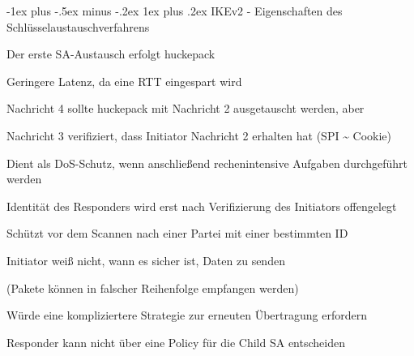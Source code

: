\documentclass[a4paper]{article}
\makeatletter
\renewcommand{\subsubsection}{\@startsection{subsubsection}{3}{0mm}%
 {-1ex plus -.5ex minus -.2ex}%
 {1ex plus .2ex}%
 {\normalfont\small\bfseries}}
\makeatother
\begin{document}
\begin{multicols}{3}
      \subsubsection{IKEv2 - Eigenschaften des Schlüsselaustauschverfahrens}
      \begin{itemize*}
            \item Der erste SA-Austausch erfolgt huckepack
            \begin{itemize*}
                  \item Geringere Latenz, da eine RTT eingespart wird
            \end{itemize*}
            \item Nachricht 4 sollte huckepack mit Nachricht 2 ausgetauscht werden, aber
            \begin{itemize*}
                  \item Nachricht 3 verifiziert, dass Initiator Nachricht 2 erhalten hat (SPI \textasciitilde{} Cookie)
                  \begin{itemize*}
                        \item Dient als DoS-Schutz, wenn anschließend rechenintensive Aufgaben durchgeführt werden
                  \end{itemize*}
                  \item Identität des Responders wird erst nach Verifizierung des Initiators offengelegt
                  \begin{itemize*}
                        \item Schützt vor dem Scannen nach einer Partei mit einer bestimmten ID
                  \end{itemize*}
                  \item Initiator weiß nicht, wann es sicher ist, Daten zu senden
                  \begin{itemize*}
                        \item (Pakete können in falscher Reihenfolge empfangen werden)
                  \end{itemize*}
                  \item Würde eine kompliziertere Strategie zur erneuten Übertragung erfordern
                  \item Responder kann nicht über eine Policy für die Child SA entscheiden
            \end{itemize*}
      \end{itemize*}


\end{multicols}
\end{document}
